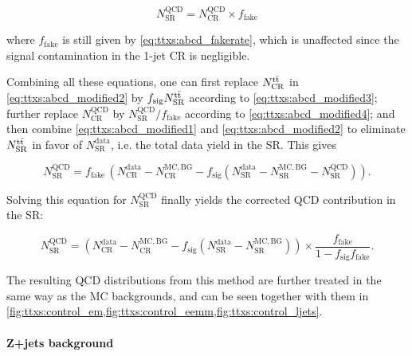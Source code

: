 \begin{equation}
\label{eq:ttxs:abcd_modified4}
    N^{\mathrm{QCD}}_{\mathrm{SR}} = N^{\mathrm{QCD}}_{\mathrm{CR}} \times f_{\mathrm{fake}}
\end{equation}

\noindent where $f_{\mathrm{fake}}$ is still given by \cref{eq:ttxs:abcd_fakerate}, which is unaffected since the \ttbar signal contamination in the 1-jet CR is negligible.

Combining all these equations, one can first replace $N^{\mathrm{t \bar{t}}}_{\mathrm{CR}}$ in \cref{eq:ttxs:abcd_modified2} by $f_{\mathrm{sig}} N^{\mathrm{t \bar{t}}}_{\mathrm{SR}}$ according to \cref{eq:ttxs:abcd_modified3}; further replace $N^{\mathrm{QCD}}_{\mathrm{CR}}$ by $N^{\mathrm{QCD}}_{\mathrm{SR}} / f_{\mathrm{fake}}$ according to \cref{eq:ttxs:abcd_modified4}; and then combine \cref{eq:ttxs:abcd_modified1} and \cref{eq:ttxs:abcd_modified2} to eliminate $N^{\mathrm{t \bar{t}}}_{\mathrm{SR}}$ in favor of $N^{\mathrm{data}}_{\mathrm{SR}}$, i.e. the total data yield in the SR. This gives

\begin{equation}
    N^{\mathrm{QCD}}_{\mathrm{SR}} = f_{\mathrm{fake}} \, \left( N^{\mathrm{data}}_{\mathrm{CR}} - N^{\mathrm{MC,BG}}_{\mathrm{CR}} - f_{\mathrm{sig}} \left( N^{\mathrm{data}}_{\mathrm{SR}} - N^{\mathrm{MC,BG}}_{\mathrm{SR}} - N^{\mathrm{QCD}}_{\mathrm{SR}} \right) \right).
\end{equation}

Solving this equation for $N^{\mathrm{QCD}}_{\mathrm{SR}}$ finally yields the corrected QCD contribution in the SR:

\begin{equation}
\label{eq:ttxs:abcd_modified}
    N^{\mathrm{QCD}}_{\mathrm{SR}} = \left( N^{\mathrm{data}}_{\mathrm{CR}} - N^{\mathrm{MC,BG}}_{\mathrm{CR}} - f_{\mathrm{sig}} \left( N^{\mathrm{data}}_{\mathrm{SR}} - N^{\mathrm{MC,BG}}_{\mathrm{SR}} \right)\right)
    \times \frac{ f_{\mathrm{fake}} } {1 - f_{\mathrm{sig}} f_{\mathrm{fake}}}.
\end{equation}

The resulting QCD distributions from this method are further treated in the same way as the MC backgrounds, and can be seen together with them in \cref{fig:ttxs:control_em,fig:ttxs:control_eemm,fig:ttxs:control_ljets}.
  

\paragraph{Z+jets background}

